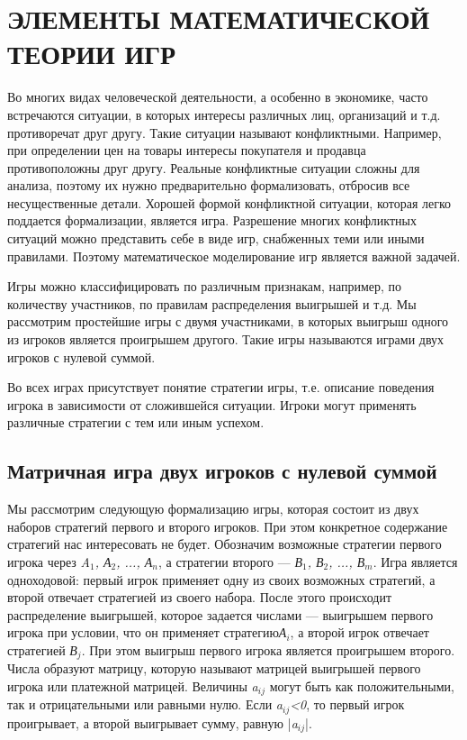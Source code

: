 \section{ЭЛЕМЕНТЫ МАТЕМАТИЧЕСКОЙ ТЕОРИИ ИГР}

Во многих видах человеческой деятельности, а особенно в экономике, часто встречаются ситуации, в которых интересы различных лиц, организаций и т.д. противоречат друг  другу. Такие ситуации называют конфликтными. Например, при определении цен на товары интересы покупателя и продавца противоположны друг другу. Реальные конфликтные ситуации сложны для анализа, поэтому их нужно предварительно формализовать, отбросив все несущественные детали. Хорошей формой конфликтной ситуации, которая легко поддается формализации, является игра. Разрешение многих конфликтных ситуаций можно представить себе в виде игр, снабженных теми или иными правилами. Поэтому математическое моделирование игр является важной задачей.

Игры можно классифицировать по различным признакам, например, по количеству участников, по правилам распределения выигрышей и т.д.  Мы рассмотрим простейшие игры с двумя участниками, в которых выигрыш одного из игроков является проигрышем другого. Такие игры называются играми двух игроков с нулевой суммой.

Во всех играх присутствует понятие стратегии игры, т.е. описание поведения игрока в зависимости от сложившейся ситуации. Игроки могут применять различные стратегии с тем или иным успехом.

\subsection{Матричная игра двух игроков с нулевой суммой}

Мы рассмотрим следующую формализацию игры, которая состоит из двух наборов стратегий первого и второго игроков. При этом конкретное содержание стратегий  нас  интересовать не будет. Обозначим возможные стратегии первого игрока через \emph{A$_{1}$, А$_{2}$, ..., А$_{n}$}, а стратегии второго — \emph{В$_{1}$, В$_{2}$, ..., В$_{m}$}. Игра является одноходовой: первый игрок применяет одну из своих возможных стратегий, а второй отвечает стратегией из своего набора. После этого происходит распределение выигрышей, которое задается числами   — выигрышем первого игрока при условии, что он  применяет стратегию\emph{А$_{i}$}, а второй игрок отвечает стратегией \emph{В$_{j}$}. При этом выигрыш первого игрока является проигрышем второго. Числа   образуют матрицу, которую  называют матрицей выигрышей первого игрока или платежной матрицей. Величины \emph{a$_{ij}$}  могут быть как положительными, так и отрицательными или равными нулю. Если \emph{a$_{ij}$<0}, то первый игрок проигрывает, а второй выигрывает сумму, равную |\emph{a$_{ij}$}|.

